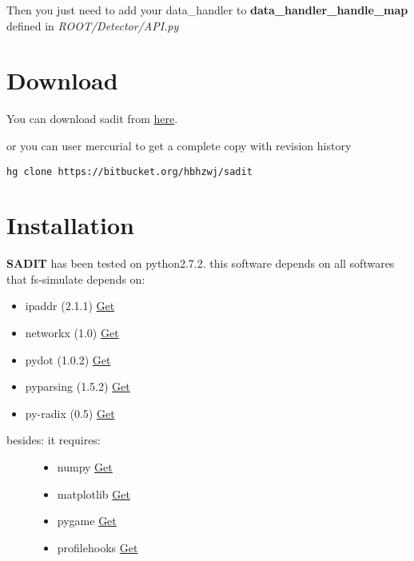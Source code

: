 \documentclass[letterpaper,10pt,english]{sphinxmanual}
\begin{document}
Then you just need to add your data\_handler to \textbf{data\_handler\_handle\_map}
defined in \emph{ROOT/Detector/API.py}


\chapter{Download}
\label{index:download}
You can download sadit from \href{https://bitbucket.org/hbhzwj/sadit/get/2182e36f40d5.zip}{here}.

or you can user mercurial to get a complete copy with revision history

\begin{Verbatim}[commandchars=\\\{\}]
hg clone https://bitbucket.org/hbhzwj/sadit
\end{Verbatim}


\chapter{Installation}
\label{index:installation}
\textbf{SADIT} has been tested on python2.7.2.
this software depends on all softwares that fs-simulate depends on:
\begin{itemize}
\item {} 
ipaddr (2.1.1)  \href{http://ipaddr-py.googlecode.com/files/ipaddr-2.1.1.tar.gz}{Get}

\item {} 
networkx (1.0) \href{http://networkx.lanl.gov/download/networkx/networkx-1.0.1.tar.gz}{Get}

\item {} 
pydot (1.0.2) \href{http://pydot.googlecode.com/files/pydot-1.0.2.tar.gz}{Get}

\item {} 
pyparsing (1.5.2) \href{http://downloads.sourceforge.net/project/pyparsing/pyparsing/pyparsing-1.5.2/pyparsing-1.5.2.tar.gz?r=http\%3A\%2F\%2Fsourceforge.net\%2Fprojects\%2Fpyparsing\%2Ffiles\%2Fpyparsing\%2Fpyparsing-1.5.2\%2F\&ts=1332828745\&use\_mirror=softlayer}{Get}

\item {} 
py-radix (0.5) \href{http://py-radix.googlecode.com/files/py-radix-0.5.tar.gz}{Get}

\end{itemize}
\begin{description}
\item[{besides: it requires:}] \leavevmode\begin{itemize}
\item {} 
numpy \href{http://numpy.scipy.org/}{Get}

\item {} 
matplotlib \href{http://matplotlib.sourceforge.net/}{Get}

\item {} 
pygame \href{http://www.pygame.org/news.html}{Get}

\item {} 
profilehooks \href{http://mg.pov.lt/profilehooks/}{Get}

\end{itemize}

\end{description}
\end{document}
